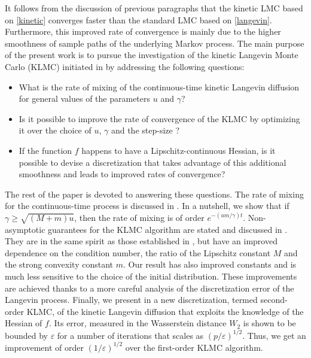 \documentclass[a4paper,bej,preprint,reqno]{imsart}
\begin{document}
It follows from the discussion of previous paragraphs that the kinetic LMC based on \eqref{kinetic} converges faster than the standard LMC based on \eqref{langevin}. Furthermore, this improved rate of convergence is mainly due to the higher smoothness of sample paths of the underlying Markov process. The main purpose of the present work is to
pursue the investigation of the kinetic Langevin Monte Carlo (KLMC) initiated in
\citep{Cheng2} by addressing the following questions:
\vspace{-10pt}
\begin{itemize}\itemsep=1pt
\item[\bf Q1.] What is the rate of mixing of the continuous-time kinetic
Langevin diffusion for general values of the parameters $u$ and $\gamma$?
\item[\bf Q2.] Is it possible to improve the rate of convergence of the KLMC by
optimizing it over the choice of $u$, $\gamma$ and the step-size ?
\item[\bf Q3.] If the function $f$ happens to have a Lipschitz-continuous Hessian, is it
possible to devise a discretization that takes advantage of this additional
smoothness and leads to improved rates of convergence?
\end{itemize}
\vspace{-10pt}
The rest of the paper is devoted to answering these questions. The rate of mixing
for the  continuous-time process is discussed in .  In a
nutshell, we show that if $\gamma\ge \sqrt{(M+m)u}$, then the rate of mixing is of order
$e^{-(um/\gamma)t}$. Non-asymptotic guarantees for the KLMC algorithm are stated and
discussed in . They are in the same spirit as those established in
\citep{Cheng2}, but have an improved dependence on the condition number, the ratio of
the Lipschitz constant $M$ and the strong convexity constant $m$. Our result has also
improved constants and is much less sensitive to the choice of the initial distribution.
These improvements are achieved thanks to a more careful analysis of the discretization
error of the Langevin process. Finally, we present in  a new
discretization, termed second-order KLMC, of the kinetic Langevin diffusion that exploits
the knowledge of the Hessian of $f$. Its error, measured in the Wasserstein distance
$W_2$ is shown  to be bounded by $\varepsilon$ for a number of iterations that scales
as $(p/\varepsilon)^{1/2}$. Thus, we get an improvement of order $(1/\varepsilon)^{1/2}$
over the first-order KLMC algorithm.
\end{document}
